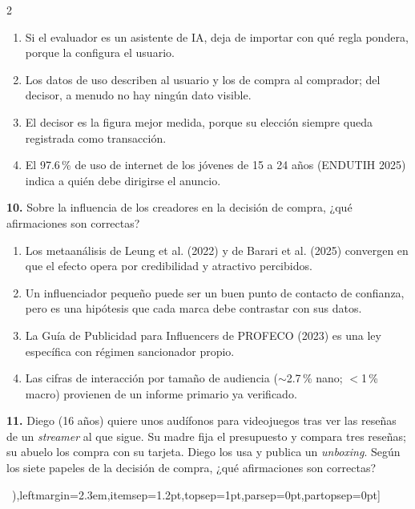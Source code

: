 \documentclass[10pt,letterpaper]{article}
\newcommand{\cas}{\framebox[1.0em]{\rule{0pt}{1.05ex}}}
\begin{document}
\begin{multicols}{2}
\begin{minipage}[t]{\columnwidth}
\begin{enumerate}[label=\cas\ \alph*),leftmargin=2.3em,itemsep=1.2pt,topsep=1pt,parsep=0pt,partopsep=0pt]
\item Si el evaluador es un asistente de IA, deja de importar con qué regla pondera, porque la configura el usuario.
\item Los datos de uso describen al usuario y los de compra al comprador; del decisor, a menudo no hay ningún dato visible.
\item El decisor es la figura mejor medida, porque su elección siempre queda registrada como transacción.
\item El 97.6\,\% de uso de internet de los jóvenes de 15 a 24 años (ENDUTIH 2025) indica a quién debe dirigirse el anuncio.
\end{enumerate}\end{minipage}\par\vspace{3pt}
\begin{minipage}[t]{\columnwidth}\noindent\textbf{10.} Sobre la influencia de los creadores en la decisión de compra, ¿qué afirmaciones son correctas?
\vspace{1pt}\begin{enumerate}[label=\cas\ \alph*),leftmargin=2.3em,itemsep=1.2pt,topsep=1pt,parsep=0pt,partopsep=0pt]
\item Los metaanálisis de Leung et al. (2022) y de Barari et al. (2025) convergen en que el efecto opera por credibilidad y atractivo percibidos.
\item Un influenciador pequeño puede ser un buen punto de contacto de confianza, pero es una hipótesis que cada marca debe contrastar con sus datos.
\item La Guía de Publicidad para Influencers de PROFECO (2023) es una ley específica con régimen sancionador propio.
\item Las cifras de interacción por tamaño de audiencia (${\sim}$2.7\,\% nano; $<$1\,\% macro) provienen de un informe primario ya verificado.
\end{enumerate}\end{minipage}\par\vspace{3pt}
\begin{minipage}[t]{\columnwidth}\noindent\textbf{11.} Diego (16 años) quiere unos audífonos para videojuegos tras ver las reseñas de un \textit{streamer} al que sigue. Su madre fija el presupuesto y compara tres reseñas; su abuelo los compra con su tarjeta. Diego los usa y publica un \textit{unboxing}. Según los siete papeles de la decisión de compra, ¿qué afirmaciones son correctas?
\vspace{1pt}\begin{enumerate}[label=\cas\ \alph*),leftmargin=2.3em,itemsep=1.2pt,topsep=1pt,parsep=0pt,partopsep=0pt]

\end{enumerate}
\end{minipage}
\end{multicols}
\end{document}

